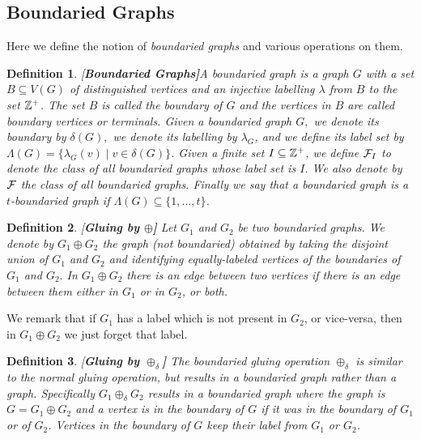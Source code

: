 \documentclass[11pt]{article}
\newtheorem{definition}{Definition}
\newcommand{\mar}[1]{#1}
\newcommand{\term}[1]{#1}
\begin{document}
\subsection{Boundaried Graphs} 
\label{subsec:boungrap}
Here we define the notion of {\em boundaried graphs} and various operations on them.
\begin{definition}{\rm [\bf Boundaried Graphs]}\label{def:boungraph}
A \term{boundaried graph} is a graph $G$ with a set $B\subseteq V(G)$ 
of  distinguished vertices and an injective labelling $\mar{\lambda}$ 
from $B$  to the set $\Bbb{Z}^{+}$. The set $B$ is called the \term{{\em boundary}} of $G$ and  the vertices in $B$  are called  {\em boundary vertices} or \term{{\em terminals}}. 
Given a boundaried graph $G,$ we denote its boundary by $\mar{\delta(G)},$
we denote its labelling by $\lambda_G$, 
and we define its {\em label set} by $\mar{\Lambda(G)}=\{\lambda_{G}(v)\mid v\in \delta(G)\}$.
Given a finite set $I\subseteq \Bbb{Z}^{+}$, we define 
$\mar{{\cal F}_{I}}$  to denote the class of all boundaried graphs whose label set is $I$. 
We also denote by $\mar{{\cal F}}$ the class of all boundaried graphs.
Finally we say that a boundaried graph is a {\em $t$-boundaried} graph if $\Lambda(G)\subseteq \{1,\ldots,t\}$.
\end{definition}





\begin{definition}{\rm [\bf Gluing by $\oplus$]} Let $G_1$ and $G_2$ be two  boundaried graphs. We denote by $G_1 \mar{\oplus} G_2$ the  graph 
(not boundaried) obtained by taking the disjoint union of $G_1$ and $G_2$ and identifying equally-labeled vertices of the boundaries of $G_{1}$ and $G_{2}.$ In $G_1 \oplus G_2$ there is an edge between two vertices if there is  an edge between them either in $G_1$ or in $G_2$, or both.  
\end{definition}

We remark that if $G_1$ has a label which is not present in $G_2$, or vice-versa, then in $G_1 \oplus G_2$ we just forget that label. 

\begin{definition} {\rm [\bf Gluing by $\oplus_\delta$]}
The {\em boundaried gluing operation} $\oplus_{\delta}$ is similar to the normal gluing operation, but results in a boundaried graph rather than a graph. Specifically $G_1 \oplus_\delta G_2$ results in a boundaried graph where the graph is $G = G_1 \oplus G_2$ and a vertex is in the boundary of $G$ if it was in the boundary of $G_1$ or  of $G_2$. Vertices in the boundary of $G$ keep their label from $G_1$ or $G_2$. 
\end{definition}
\end{document}
